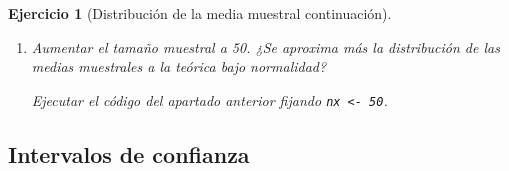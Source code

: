 \documentclass[
]{book}
\newenvironment{Shaded}{\begin{snugshade}}{\end{snugshade}}
\newcommand{\AttributeTok}[1]{\textcolor[rgb]{0.77,0.63,0.00}{#1}}
\newcommand{\CommentTok}[1]{\textcolor[rgb]{0.56,0.35,0.01}{\textit{#1}}}
\newcommand{\ConstantTok}[1]{\textcolor[rgb]{0.00,0.00,0.00}{#1}}
\newcommand{\DecValTok}[1]{\textcolor[rgb]{0.00,0.00,0.81}{#1}}
\newcommand{\FloatTok}[1]{\textcolor[rgb]{0.00,0.00,0.81}{#1}}
\newcommand{\FunctionTok}[1]{\textcolor[rgb]{0.00,0.00,0.00}{#1}}
\newcommand{\NormalTok}[1]{#1}
\newcommand{\SpecialCharTok}[1]{\textcolor[rgb]{0.00,0.00,0.00}{#1}}
\newcommand{\StringTok}[1]{\textcolor[rgb]{0.31,0.60,0.02}{#1}}
\theoremstyle{break}
\newtheorem{exercise}{Ejercicio}[chapter]
\theoremstyle{nonumberplain}
\renewcommand{\CommentTok}[1]{\textcolor[rgb]{0.41,0.41,0.41}{\texttt{#1}}}
\begin{document}
\begin{exercise}[Distribución de la media muestral continuación]
\begin{enumerate}
\begin{Shaded}
\end{Shaded}

  \begin{figure}[!htb]

  {\centering \texttt{[image: 07-Monte\_Carlo\_files/figure-latex/medexp-1]} 

  }

  \caption{Distribución de la media muestral de una distribución exponencial y distribución asintótica.}\label{fig:medexp}
  \end{figure}
\item
  Aumentar el tamaño muestral a 50. ¿Se aproxima más la
  distribución de las medias muestrales a la teórica bajo
  normalidad?

  Ejecutar el código del apartado anterior fijando \texttt{nx\ \textless{}-\ 50}.
\end{enumerate}

\end{exercise}

\hypertarget{intervalos-de-confianza}{%
\subsection{Intervalos de confianza}\label{intervalos-de-confianza}}
\end{document}
